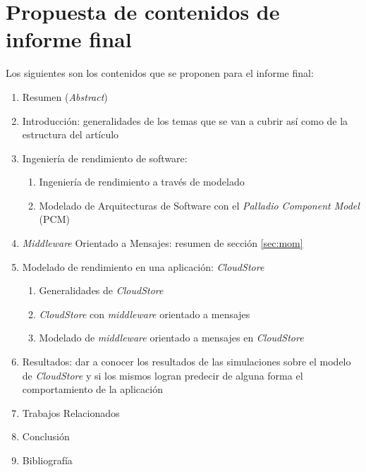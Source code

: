 \documentclass[11pt, twoside]{report}
\begin{document}
\chapter{Propuesta de contenidos de informe final} \label{ch:propuesta-informe}
Los siguientes son los contenidos que se proponen para el informe final:
\begin{enumerate}
    \item Resumen (\emph{Abstract})
    \item Introducción: generalidades de los temas que se van a cubrir así como de la estructura del artículo
    \item Ingeniería de rendimiento de software:
    \begin{enumerate}
        \item Ingeniería de rendimiento a través de modelado
        \item Modelado de Arquitecturas de Software con el \emph{Palladio Component Model} (PCM)
    \end{enumerate}
    \item \emph{Middleware} Orientado a Mensajes: resumen de sección \ref{sec:mom}
    \item Modelado de rendimiento en una aplicación: \emph{CloudStore}
    \begin{enumerate}
        \item Generalidades de \emph{CloudStore}
        \item \emph{CloudStore} con \emph{middleware} orientado a mensajes
        \item Modelado de \emph{middleware} orientado a mensajes en \emph{CloudStore}
    \end{enumerate}
    \item Resultados: dar a conocer los resultados de las simulaciones sobre el modelo de \emph{CloudStore} y si los mismos logran predecir de alguna forma el comportamiento de la aplicación
    \item Trabajos Relacionados
    \item Conclusión
    \item Bibliografía
\end{enumerate}
\end{document}
